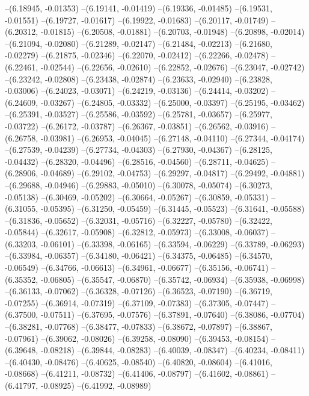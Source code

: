 --(6.18945, -0.01353)
--(6.19141, -0.01419)
--(6.19336, -0.01485)
--(6.19531, -0.01551)
--(6.19727, -0.01617)
--(6.19922, -0.01683)
--(6.20117, -0.01749)
--(6.20312, -0.01815)
--(6.20508, -0.01881)
--(6.20703, -0.01948)
--(6.20898, -0.02014)
--(6.21094, -0.02080)
--(6.21289, -0.02147)
--(6.21484, -0.02213)
--(6.21680, -0.02279)
--(6.21875, -0.02346)
--(6.22070, -0.02412)
--(6.22266, -0.02478)
--(6.22461, -0.02544)
--(6.22656, -0.02610)
--(6.22852, -0.02676)
--(6.23047, -0.02742)
--(6.23242, -0.02808)
--(6.23438, -0.02874)
--(6.23633, -0.02940)
--(6.23828, -0.03006)
--(6.24023, -0.03071)
--(6.24219, -0.03136)
--(6.24414, -0.03202)
--(6.24609, -0.03267)
--(6.24805, -0.03332)
--(6.25000, -0.03397)
--(6.25195, -0.03462)
--(6.25391, -0.03527)
--(6.25586, -0.03592)
--(6.25781, -0.03657)
--(6.25977, -0.03722)
--(6.26172, -0.03787)
--(6.26367, -0.03851)
--(6.26562, -0.03916)
--(6.26758, -0.03981)
--(6.26953, -0.04045)
--(6.27148, -0.04110)
--(6.27344, -0.04174)
--(6.27539, -0.04239)
--(6.27734, -0.04303)
--(6.27930, -0.04367)
--(6.28125, -0.04432)
--(6.28320, -0.04496)
--(6.28516, -0.04560)
--(6.28711, -0.04625)
--(6.28906, -0.04689)
--(6.29102, -0.04753)
--(6.29297, -0.04817)
--(6.29492, -0.04881)
--(6.29688, -0.04946)
--(6.29883, -0.05010)
--(6.30078, -0.05074)
--(6.30273, -0.05138)
--(6.30469, -0.05202)
--(6.30664, -0.05267)
--(6.30859, -0.05331)
--(6.31055, -0.05395)
--(6.31250, -0.05459)
--(6.31445, -0.05523)
--(6.31641, -0.05588)
--(6.31836, -0.05652)
--(6.32031, -0.05716)
--(6.32227, -0.05780)
--(6.32422, -0.05844)
--(6.32617, -0.05908)
--(6.32812, -0.05973)
--(6.33008, -0.06037)
--(6.33203, -0.06101)
--(6.33398, -0.06165)
--(6.33594, -0.06229)
--(6.33789, -0.06293)
--(6.33984, -0.06357)
--(6.34180, -0.06421)
--(6.34375, -0.06485)
--(6.34570, -0.06549)
--(6.34766, -0.06613)
--(6.34961, -0.06677)
--(6.35156, -0.06741)
--(6.35352, -0.06805)
--(6.35547, -0.06870)
--(6.35742, -0.06934)
--(6.35938, -0.06998)
--(6.36133, -0.07062)
--(6.36328, -0.07126)
--(6.36523, -0.07190)
--(6.36719, -0.07255)
--(6.36914, -0.07319)
--(6.37109, -0.07383)
--(6.37305, -0.07447)
--(6.37500, -0.07511)
--(6.37695, -0.07576)
--(6.37891, -0.07640)
--(6.38086, -0.07704)
--(6.38281, -0.07768)
--(6.38477, -0.07833)
--(6.38672, -0.07897)
--(6.38867, -0.07961)
--(6.39062, -0.08026)
--(6.39258, -0.08090)
--(6.39453, -0.08154)
--(6.39648, -0.08218)
--(6.39844, -0.08283)
--(6.40039, -0.08347)
--(6.40234, -0.08411)
--(6.40430, -0.08476)
--(6.40625, -0.08540)
--(6.40820, -0.08604)
--(6.41016, -0.08668)
--(6.41211, -0.08732)
--(6.41406, -0.08797)
--(6.41602, -0.08861)
--(6.41797, -0.08925)
--(6.41992, -0.08989)
